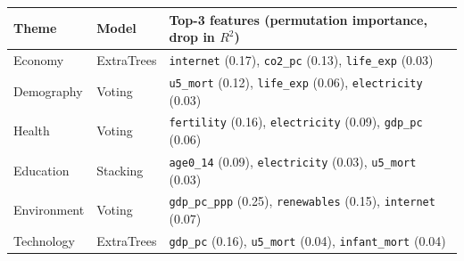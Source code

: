 \footnotesize
\begin{tabular}{llp{10cm}}
\toprule
Theme & Model & Top-3 features (permutation importance, drop in $R^2$) \\
\midrule
Economy & ExtraTrees & \texttt{internet} (0.17), \texttt{co2\_pc} (0.13), \texttt{life\_exp} (0.03) \\
Demography & Voting & \texttt{u5\_mort} (0.12), \texttt{life\_exp} (0.06), \texttt{electricity} (0.03) \\
Health & Voting & \texttt{fertility} (0.16), \texttt{electricity} (0.09), \texttt{gdp\_pc} (0.06) \\
Education & Stacking & \texttt{age0\_14} (0.09), \texttt{electricity} (0.03), \texttt{u5\_mort} (0.03) \\
Environment & Voting & \texttt{gdp\_pc\_ppp} (0.25), \texttt{renewables} (0.15), \texttt{internet} (0.07) \\
Technology & ExtraTrees & \texttt{gdp\_pc} (0.16), \texttt{u5\_mort} (0.04), \texttt{infant\_mort} (0.04) \\
\bottomrule
\end{tabular}
